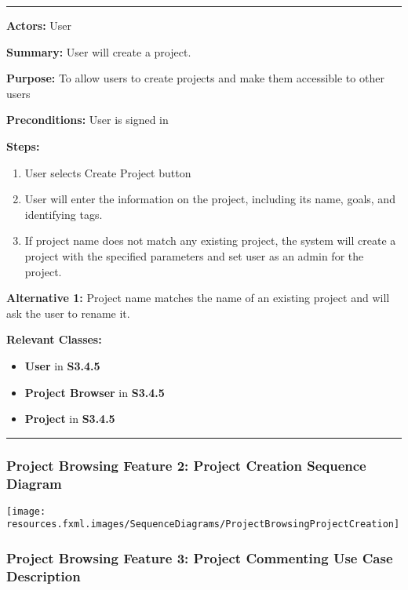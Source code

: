 \documentclass[twoside,letterpaper]{article}
\begin{document}
\vspace{2pt}
\hrule
\vspace{8pt}
\textbf{Actors:} User \newline

\noindent\textbf{Summary:} User will create a project. \newline

\noindent\textbf{Purpose:} To allow users to create projects and make them accessible to other users \newline

\noindent\textbf{Preconditions:} User is signed in \newline

\noindent\textbf{Steps:} \begin{enumerate}
	\item User selects Create Project button
	\item User will enter the information on the project, including its name, goals, and identifying tags.
	\item If project name does not match any existing project, the system will create a project with the specified parameters and set user as an admin for the project.
\end{enumerate}
\noindent\textbf{Alternative 1:} Project name matches the name of an existing project and will ask the user to rename it. \newline


\noindent\textbf{Relevant Classes:}
\begin{itemize}
	\item \textbf{User} in \textbf{S3.4.5}
	\item \textbf{Project Browser} in \textbf{S3.4.5}
	\item \textbf{Project} in \textbf{S3.4.5}
\end{itemize}
\vspace{8pt}
\hrule
\newpage
\subsubsection[Project Browsing Feature 2: Project Creation Sequence Diagram]{\rmfamily\bfseries\color{black}
	Project Browsing Feature 2: Project Creation Sequence Diagram}
\hypertarget{RefHeading22059017292}{}

\bigskip

\texttt{[image: resources.fxml.images/SequenceDiagrams/ProjectBrowsingProjectCreation]}

\newpage
\subsubsection[Project Browsing Feature 3: Project Commenting Use Case Description]{\rmfamily\bfseries\color{black}
Project Browsing Feature 3: Project Commenting Use Case Description}
\hypertarget{RefHeading22059017292}{}
\end{document}
